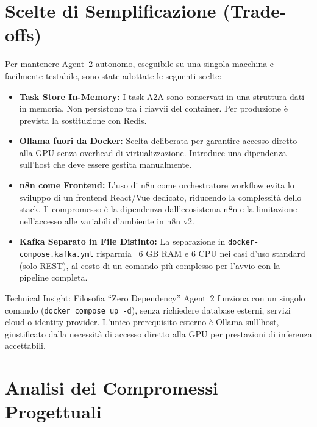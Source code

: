 \documentclass[12pt,a4paper]{report}
\begin{document}
\section{Scelte di Semplificazione (Trade-offs)}

Per mantenere Agent~2 autonomo, eseguibile su una singola macchina e
facilmente testabile, sono state adottate le seguenti scelte:

\begin{itemize}
  \item \textbf{Task Store In-Memory:} I task A2A sono conservati in una
        struttura dati in memoria. Non persistono tra i riavvii del container.
        Per produzione è prevista la sostituzione con Redis.

  \item \textbf{Ollama fuori da Docker:} Scelta deliberata per garantire
        accesso diretto alla GPU senza overhead di virtualizzazione.
        Introduce una dipendenza sull'host che deve essere gestita manualmente.

  \item \textbf{n8n come Frontend:} L'uso di n8n come orchestratore workflow
        evita lo sviluppo di un frontend React/Vue dedicato, riducendo la
        complessità dello stack. Il compromesso è la dipendenza dall'ecosistema n8n
        e la limitazione nell'accesso alle variabili d'ambiente in n8n v2.

  \item \textbf{Kafka Separato in File Distinto:} La separazione in
        \texttt{docker-compose.kafka.yml} risparmia ~6 GB RAM e 6 CPU nei
        casi d'uso standard (solo REST), al costo di un comando più complesso
        per l'avvio con la pipeline completa.
\end{itemize}

\begin{technicalbox}{Technical Insight: Filosofia ``Zero Dependency''}
Agent~2 funziona con un singolo comando (\texttt{docker compose up -d}),
senza richiedere database esterni, servizi cloud o identity provider.
L'unico prerequisito esterno è Ollama sull'host, giustificato dalla necessità
di accesso diretto alla GPU per prestazioni di inferenza accettabili.
\end{technicalbox}
\section{Analisi dei Compromessi Progettuali}
\end{document}
